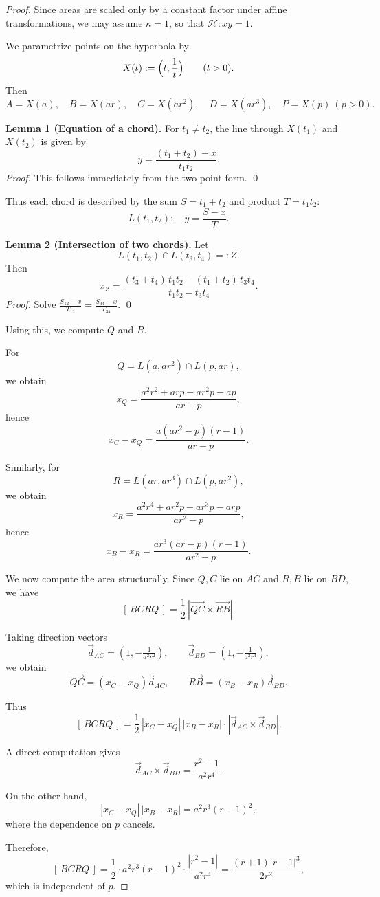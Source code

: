 \documentclass[12pt]{article}
\begin{document}
\begin{proof}
Since areas are scaled only by a constant factor under affine transformations,
we may assume $\kappa=1$, so that $\mathcal H:xy=1$.

We parametrize points on the hyperbola by
\[
X(t):=\Bigl(t,\frac{1}{t}\Bigr)\qquad (t>0).
\]
Then
\[
A=X(a),\quad B=X(ar),\quad C=X(ar^2),\quad D=X(ar^3),\quad P=X(p)\ (p>0).
\]

\medskip
\noindent
\textbf{Lemma 1 (Equation of a chord).}
For $t_1\neq t_2$, the line through $X(t_1)$ and $X(t_2)$ is given by
\[
y=\frac{(t_1+t_2)-x}{t_1t_2}.
\]
\emph{Proof.} This follows immediately from the two-point form. \qed

\medskip
Thus each chord is described by the sum $S=t_1+t_2$ and product $T=t_1t_2$:
\[
L(t_1,t_2):\quad y=\frac{S-x}{T}.
\]

\medskip
\noindent
\textbf{Lemma 2 (Intersection of two chords).}
Let
\[
L(t_1,t_2)\cap L(t_3,t_4)=:Z.
\]
Then
\[
x_Z=\frac{(t_3+t_4)\,t_1t_2-(t_1+t_2)\,t_3t_4}{t_1t_2-t_3t_4}.
\]
\emph{Proof.} Solve $\frac{S_{12}-x}{T_{12}}=\frac{S_{34}-x}{T_{34}}$. \qed

\medskip
Using this, we compute $Q$ and $R$.

For
\[
Q=L(a,ar^2)\cap L(p,ar),
\]
we obtain
\[
x_Q=\frac{a^2r^2+arp-ar^2p-ap}{ar-p},
\]
hence
\[
x_C-x_Q=\frac{a(ar^2-p)(r-1)}{ar-p}.
\]

Similarly, for
\[
R=L(ar,ar^3)\cap L(p,ar^2),
\]
we obtain
\[
x_R=\frac{a^2r^4+ar^2p-ar^3p-arp}{ar^2-p},
\]
hence
\[
x_B-x_R=\frac{a r^3(ar-p)(r-1)}{ar^2-p}.
\]

\medskip
We now compute the area structurally.
Since $Q,C$ lie on $AC$ and $R,B$ lie on $BD$,
we have
\[
[\,BCRQ\,]=\frac{1}{2}\,|\overrightarrow{QC}\times\overrightarrow{RB}|.
\]

Taking direction vectors
\[
\vec d_{AC}=(1,-\tfrac{1}{a^2r^2}),\qquad
\vec d_{BD}=(1,-\tfrac{1}{a^2r^4}),
\]
we obtain
\[
\overrightarrow{QC}=(x_C-x_Q)\vec d_{AC},\qquad
\overrightarrow{RB}=(x_B-x_R)\vec d_{BD}.
\]

Thus
\[
[\,BCRQ\,]
=
\frac{1}{2}\,|x_C-x_Q|\,|x_B-x_R|\cdot|\vec d_{AC}\times\vec d_{BD}|.
\]

A direct computation gives
\[
\vec d_{AC}\times\vec d_{BD}
=
\frac{r^2-1}{a^2r^4}.
\]

On the other hand,
\[
|x_C-x_Q|\,|x_B-x_R|
=
a^2r^3(r-1)^2,
\]
where the dependence on $p$ cancels.

Therefore,
\[
[\,BCRQ\,]
=
\frac12\cdot a^2r^3(r-1)^2\cdot \frac{|r^2-1|}{a^2r^4}
=
\frac{(r+1)|r-1|^3}{2r^2},
\]
which is independent of $p$.
\end{proof}
\end{document}
